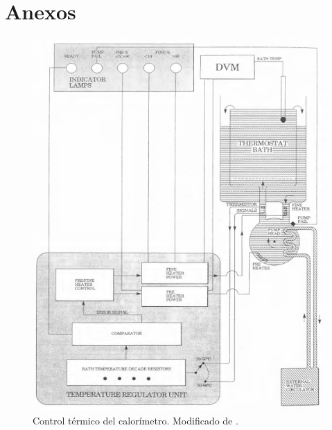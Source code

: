 
%




\chapter{Anexos}\label{ch: anexos}
	\begin{figure}[!h]
		\centering
		\includegraphics[width =\linewidth]{Figures/controlTemperatura}
		\caption{Control t\'ermico del calor\'imetro. Modificado de \cite{Suurkuusk}.}
		\label{fig: controlTermico}
	\end{figure}

